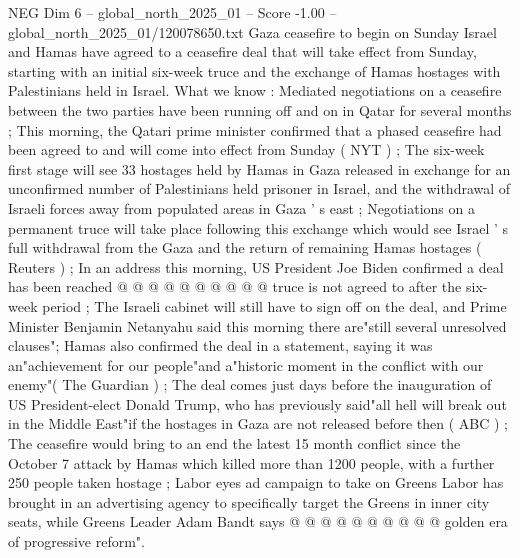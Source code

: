 \begin{textsample}{NEG Dim 6 – global\_north\_2025\_01 – Score -1.00 – global\_north\_2025\_01/120078650.txt}  \label{ex:f6_neg_183}
Gaza ceasefire to begin on Sunday Israel and Hamas have agreed to a ceasefire deal that will take effect from Sunday, starting with an initial six-week truce and the exchange of Hamas hostages with Palestinians held in Israel.
What we know : Mediated negotiations on a ceasefire between the two parties have been running off and on in Qatar for several months ; This morning, the Qatari prime minister confirmed that a phased ceasefire had been agreed to and will come into effect from Sunday ( NYT ) ; The six-week first stage will see 33 hostages held by Hamas in Gaza released in exchange for an unconfirmed number of Palestinians held prisoner in Israel, and the withdrawal of Israeli forces away from populated areas in Gaza ' s east ; Negotiations on a permanent truce will take place following this exchange which would see Israel ' s full withdrawal from the Gaza and the return of remaining Hamas hostages ( Reuters ) ; In an address this morning, US President Joe Biden confirmed a deal has been reached @ @ @ @ @ @ @ @ @ @ truce is not agreed to after the six-week period ; The Israeli cabinet will still have to sign off on the deal, and Prime Minister Benjamin Netanyahu said this morning there are"still several unresolved clauses"; Hamas also confirmed the deal in a statement, saying it was an"achievement for our people"and a"historic moment in the conflict with our enemy"( The Guardian ) ; The deal comes just days before the inauguration of US President-elect Donald Trump, who has previously said"all hell will break out in the Middle East"if the hostages in Gaza are not released before then ( ABC ) ; The ceasefire would bring to an end the latest 15 month conflict since the October 7 attack by Hamas which killed more than 1200 people, with a further 250 people taken hostage ; Labor eyes ad campaign to take on Greens Labor has brought in an advertising agency to specifically target the Greens in inner city seats, while Greens Leader Adam Bandt says @ @ @ @ @ @ @ @ @ @ golden era of progressive reform".

\end{textsample}
